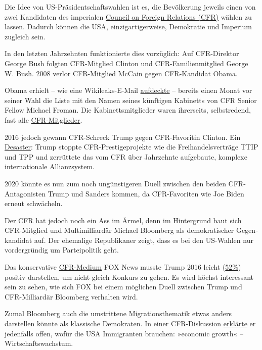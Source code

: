 Die Idee von US-Präsident­schafts­wahlen ist es, die Bevölkerung jeweils
einen von zwei Kan­di­daten des imperialen
\href{https://swprs.org/das-american-empire-und-seine-medien/}{Council
on Foreign Relations (CFR)} wählen zu lassen. Dadurch können die USA,
einzig­artiger­weise, Demokratie und Imperium zugleich sein.

In den letzten Jahrzehnten funktionierte dies vorzüglich: Auf
CFR-Direktor George Bush folgten CFR-Mitglied Clinton und
CFR-Familien­mitglied George W. Bush. 2008 verlor CFR-Mitglied McCain
gegen CFR-Kandidat Obama.

Obama erhielt -- wie eine Wikileaks-E-Mail
\href{http://observer.com/2016/10/obama-makes-first-appearance-in-wikileaks-receives-admin-list-from-big-banker/}{auf­deckte}
-- bereits einen Monat vor seiner Wahl die Liste mit den Namen seines
künftigen Kabi­netts von CFR Senior Fellow Michael Froman. Die
Kabinetts­­mitglieder waren ihrer­seits, selbstredend, fast alle
\href{https://swprs.files.wordpress.com/2017/07/cfr-administration-members-1900-2014.pdf}{CFR-Mitglieder}.

2016 jedoch gewann CFR-Schreck Trump gegen CFR-Favoritin Clinton. Ein
\href{https://swprs.org/trump-medien-geopolitik/}{Desaster}: Trump
stoppte CFR-Prestigeprojekte wie die Frei­handels­verträge TTIP und TPP
und zerrüttete das vom CFR über Jahrzehnte aufgebaute, komplexe
internationale Allianzsystem.

2020 könnte es nun zum noch ungünstigeren Duell zwischen den beiden
CFR-Antagonisten Trump und Sanders kommen, da CFR-Favoriten wie Joe
Biden erneut schwächeln.

Der CFR hat jedoch noch ein Ass im Ärmel, denn im Hintergrund baut sich
CFR-Mitglied und Multi­milliar­där Michael Bloomberg als
demo­kra­tischer Gegen­kandidat auf. Der ehemalige Republikaner zeigt,
dass es bei den US-Wahlen nur vorder­gründig um Partei­politik geht.

Das konservative
\href{https://swprs.org/das-american-empire-und-seine-medien/}{CFR-Medium}
FOX News musste Trump 2016 leicht
(\href{https://meedia.de/2017/05/23/harvard-studie-keiner-berichtete-negativer-ueber-donald-trump-als-die-ard/}{52\%})
positiv dar­stel­len, um nicht gleich Konkurs zu gehen. Es wird höchst
interessant sein zu sehen, wie sich FOX bei einem möglichen Duell
zwischen Trump und CFR-Milliardär Bloomberg verhalten wird.

Zumal Bloomberg auch die umstrittene Migrationsthematik etwas anders
darstellen könnte als klassische Demokraten. In einer CFR-Diskussion
\href{https://www.cfr.org/event/conversation-michael-bloomberg}{erklärte}
er jedenfalls offen, wofür die USA Immigranten brauchen: »economic
growth« -- Wirtschaftswachstum.

